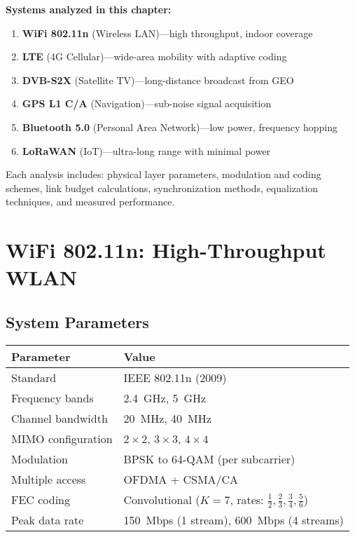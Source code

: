 \textbf{Systems analyzed in this chapter:}
\begin{enumerate}
\item \textbf{WiFi 802.11n} (Wireless LAN)---high throughput, indoor coverage
\item \textbf{LTE} (4G Cellular)---wide-area mobility with adaptive coding
\item \textbf{DVB-S2X} (Satellite TV)---long-distance broadcast from GEO
\item \textbf{GPS L1 C/A} (Navigation)---sub-noise signal acquisition
\item \textbf{Bluetooth 5.0} (Personal Area Network)---low power, frequency hopping
\item \textbf{LoRaWAN} (IoT)---ultra-long range with minimal power
\end{enumerate}

Each analysis includes: physical layer parameters, modulation and coding schemes, link budget calculations, synchronization methods, equalization techniques, and measured performance.

\section{WiFi 802.11n: High-Throughput WLAN}
\label{sec:wifi}

\subsection{System Parameters}

\begin{tabular}{@{}ll@{}}
\toprule
\textbf{Parameter} & \textbf{Value} \\
\midrule
Standard & IEEE 802.11n (2009) \\
Frequency bands & 2.4~GHz, 5~GHz \\
Channel bandwidth & 20~MHz, 40~MHz \\
MIMO configuration & $2 \times 2$, $3 \times 3$, $4 \times 4$ \\
Modulation & BPSK to 64-QAM (per subcarrier) \\
Multiple access & OFDMA + CSMA/CA \\
FEC coding & Convolutional ($K = 7$, rates: $\frac{1}{2}, \frac{2}{3}, \frac{3}{4}, \frac{5}{6}$) \\
Peak data rate & 150~Mbps (1 stream), 600~Mbps (4 streams) \\
\bottomrule
\end{tabular}

